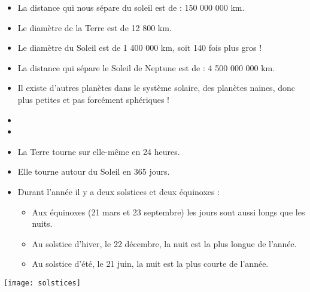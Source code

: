 \documentclass[12pt,a4paper]{article}
\begin{document}
\begin{itemize}
	\item La distance qui nous sépare du soleil est de : 150 000 000 km.
	\item Le diamètre de la Terre est de 12 800 km.
	\item Le diamètre du Soleil est de 1 400 000 km, soit 140 fois plus gros !
	\item La distance qui sépare le Soleil de Neptune est de : 
	4 500 000 000 km.
	\item Il existe d’autres planètes dans le système solaire, des planètes naines, donc plus petites et pas forcément sphériques !
	
\end{itemize}

\begin{myexos}
\begin{itemize}
	\item {}
	\item  {} 
\end{itemize}
\end{myexos}




\begin{itemize}
	\item La Terre tourne sur elle-même en 24 heures.
	\item Elle tourne autour du Soleil en 365 jours.
	\item Durant l'année il y a deux solstices et deux équinoxes :
	\begin{itemize}
		\item Aux équinoxes (21 mars et 23 septembre) les jours sont aussi longs que les nuits.  
		\item Au solstice d'hiver, le 22 décembre, la nuit est la plus longue de l'année.
		\item Au solstice d'été, le 21 juin, la nuit est la plus courte de l'année.
	\end{itemize}
\end{itemize}

\begin{center}
	\texttt{[image: solstices]}
\end{center}
\end{document}
